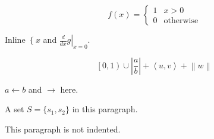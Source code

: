 \documentclass{article}
\begin{document}
\begin{equation*}
f(x) = \left\{
\begin{array}{ll}
1 & x > 0 \\
0 & \text{otherwise}
\end{array}
\right.
\end{equation*}

Inline $\left\{ x \right.$ and $\left. \frac{d}{dx} g \right|_{x=0}$.

\begin{equation*}
\left[
0, 1
\right)
\cup
\left|
\frac{a}{b}
\right|
+ \left\langle u,
v \right\rangle
+ \left\| w
\right\|
\end{equation*}

$a \leftarrow b$ and $\rightarrow$ here.

A set $S = \{s_1,
s_2\}$ in this paragraph.

This paragraph is not indented.
\end{document}

